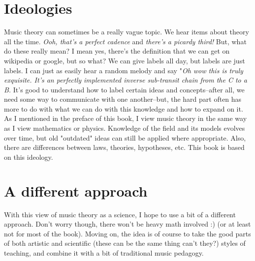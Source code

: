 \documentclass[../OpenAppliedMusicTheory.tex]{subfiles}
\begin{document}
    


    \section*{Ideologies}
    Music theory can sometimes be a really vague topic. We hear items about theory all the time. \emph{Ooh, that's a perfect cadence} and \emph{there's a picardy third!} But, what do these really mean? I mean yes, there's the definition that we can get on wikipedia or google, but so what? We can give labels all day, but labels are just labels. I can just as easily hear a random melody and say "\emph{Oh wow this is truly exquisite. It's an perfectly implemented inverse sub-transit chain from the C to a B.} It's good to understand how to label certain ideas and concepts--after all, we need some way to communicate with one another--but, the hard part often has more to do with what we can do with this knowledge and how to expand on it. As I mentioned in the  preface of this book, I view music theory in the same way as I view mathematics or physics. Knowledge of the field and its models evolves over time, but old "outdated" ideas can still be applied where appropriate. Also, there are differences between laws, theories, hypotheses, etc. This book is based on this ideology. 

    \section*{A different approach}
    With this view of music theory as a science, I hope to use a bit of a different approach. Don't worry though, there won't be heavy math involved :) (or at least not for most of the book). Moving on, the idea is of course to take the good parts of both artistic and scientific (these can be the same thing can't they?) styles of teaching, and combine it with a bit of traditional music pedagogy.
    
\end{document}
